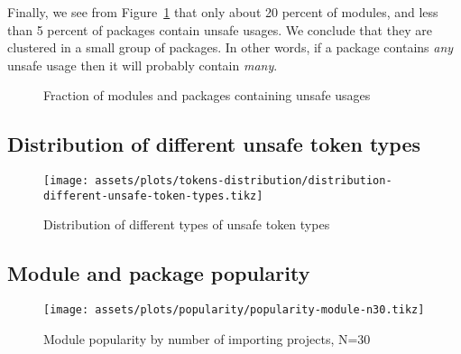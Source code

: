 Finally, we see from Figure~\ref{fig:fraction-of-unsafe-modules-and-packages} that only about 20 percent of modules, and
less than 5 percent of packages contain unsafe usages.
We conclude that they are clustered in a small group of packages.
In other words, if a package contains \textit{any} unsafe usage then it will probably contain \textit{many}.

\begin{figure}[ht]
    \centering
    \caption{Fraction of modules and packages containing unsafe usages}
    \label{fig:fraction-of-unsafe-modules-and-packages}
\end{figure}



\subsection{Distribution of different unsafe token types}\label{subsec:results-tokens-distribution}

\begin{figure}[ht]
    \centering
    {\scriptsize \texttt{[image: assets/plots/tokens-distribution/distribution-different-unsafe-token-types.tikz]}}
    \caption{Distribution of different types of unsafe token types}
    \label{fig:unsafe-tokens-distribution}
\end{figure}



\subsection{Module and package popularity}\label{subsec:results-popularity}

\begin{figure}[ht]
    \centering
    {\scriptsize \texttt{[image: assets/plots/popularity/popularity-module-n30.tikz]}}
    \caption{Module popularity by number of importing projects, N=30}
    \label{fig:popularity-module}
\end{figure}

